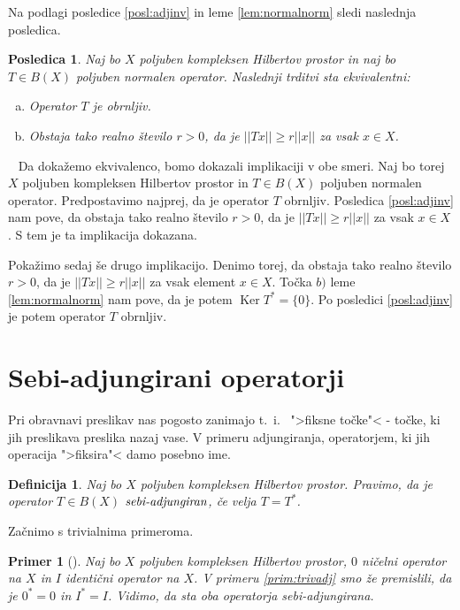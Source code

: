\documentclass[12pt,a4paper,oneside,fleqn,openany]{book}
\newtheorem{posledica}[izrek]{Posledica}
\newtheorem{definicija}[izrek]{Definicija}
\newtheorem{primer*}[izrek]{Primer}
\newcommand{\eopf}{\raisebox{0.8ex}{\framebox{}}} %
\newenvironment{dokaz}%
{\noindent{\bf Dokaz.}\ }%
{\hfill\eopf\par\bigskip}%
\newenvironment{primer}[1][]{\begin{primer*}[#1]\renewcommand*{\qedsymbol}{$\diamondsuit$}\pushQED{\qed}}{\popQED\end{primer*}}
\newcommand{\abs}[1]{\ensuremath{\lvert #1 \rvert}}
\newcommand{\norm}[1]{\abs{\abs{#1}}}
\newcommand{\pojem}[1]{\ensuremath{\emph{#1}}}
\begin{document}
Na podlagi posledice \ref{posl:adjinv} in leme \ref{lem:normalnorm} sledi naslednja posledica.

\begin{posledica}
	\label{posl:normalinv}
	Naj bo $X$ poljuben kompleksen Hilbertov prostor in naj bo $T\in B(X)$ poljuben normalen operator. Naslednji trditvi sta ekvivalentni: \begin{enumerate}[a)]
		\item Operator $T$ je obrnljiv.
		\item Obstaja tako realno število $r > 0$, da je $\norm{Tx} \geq r\norm{x}$ za vsak $x\in X$.
	\end{enumerate}
\end{posledica}

\begin{dokaz}
	Da dokažemo ekvivalenco, bomo dokazali implikaciji v obe smeri. Naj bo torej $X$ poljuben kompleksen Hilbertov prostor in $T\in B(X)$ poljuben normalen operator.
	Predpostavimo najprej, da je operator $T$ obrnljiv. Posledica \ref{posl:adjinv} nam pove, da obstaja tako realno število $r>0$, da je $\norm{Tx} \geq r\norm{x}$ za vsak $x\in X$. S tem je ta implikacija dokazana.
	
	Pokažimo sedaj še drugo implikacijo. Denimo torej, da obstaja tako realno število $r>0$, da je $\norm{Tx} \geq r\norm{x}$ za vsak element $x\in X$. Točka $b)$ leme \ref{lem:normalnorm} nam pove, da je potem $\operatorname{Ker}T^* = \{0\}$. Po posledici \ref{posl:adjinv} je potem operator $T$ obrnljiv.
\end{dokaz}

\section[Sebi-adjungirani operatorji]{Sebi-adjungirani operatorji}

Pri obravnavi preslikav nas pogosto zanimajo t.~i.~ ">fiksne točke"< - točke, ki jih preslikava preslika nazaj vase. V primeru adjungiranja, operatorjem, ki jih operacija ">fiksira"< damo posebno ime.

\begin{definicija}
	\label{def:sebiadjop}
	Naj bo $X$ poljuben kompleksen Hilbertov prostor. Pravimo, da je operator $T\in B(X)$ \pojem{sebi-adjungiran}, če velja $T = T^*$.
\end{definicija}
Začnimo s trivialnima primeroma.
\begin{primer}
	\label{prim:sebiadjtriv}
	Naj bo $X$ poljuben kompleksen Hilbertov prostor, $0$ ničelni operator na $X$ in $I$ identični operator na $X$. V primeru \ref{prim:trivadj} smo že premislili, da je $0^*=0$ in $I^* = I$. Vidimo, da sta oba operatorja sebi-adjungirana.
\end{primer}
\end{document}
